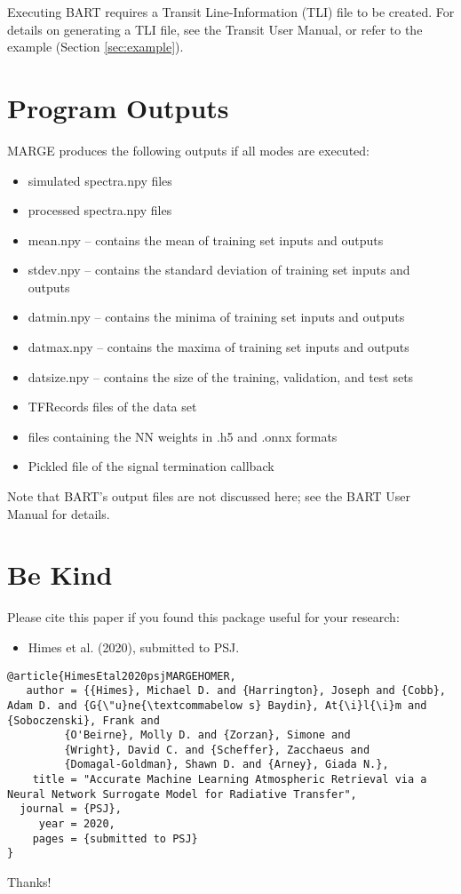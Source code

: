 \documentclass[letterpaper, 12pt]{article}
\begin{document}
\noindent  Executing BART requires a Transit Line-Information (TLI) file to 
be created.  For details on generating a TLI file, see the Transit User Manual, 
or refer to the example (Section \ref{sec:example}).



\section{Program Outputs}
\label{sec:outputs}

MARGE produces the following outputs if all modes are executed:

\begin{itemize}
\item simulated spectra.npy files
\item processed spectra.npy files
\item mean.npy -- contains the mean of training set inputs and outputs
\item stdev.npy -- contains the standard deviation of training set inputs and 
                   outputs
\item datmin.npy -- contains the minima of training set inputs and outputs
\item datmax.npy -- contains the maxima of training set inputs and outputs
\item datsize.npy -- contains the size of the training, validation, and test 
                     sets
\item TFRecords files of the data set
\item files containing the NN weights in .h5 and .onnx formats
\item Pickled file of the signal termination callback
\end{itemize}

\noindent Note that BART's output files are not discussed here; see the BART 
User Manual for details.



\section{Be Kind}
\label{sec:bekind}
Please cite this paper if you found this package useful for your
research:

\begin{itemize}
\item Himes et al. (2020), submitted to PSJ.
\end{itemize}

\begin{verbatim}
@article{HimesEtal2020psjMARGEHOMER,
   author = {{Himes}, Michael D. and {Harrington}, Joseph and {Cobb}, Adam D. and {G{\"u}ne{\textcommabelow s} Baydin}, At{\i}l{\i}m and {Soboczenski}, Frank and
         {O'Beirne}, Molly D. and {Zorzan}, Simone and
         {Wright}, David C. and {Scheffer}, Zacchaeus and
         {Domagal-Goldman}, Shawn D. and {Arney}, Giada N.},
    title = "Accurate Machine Learning Atmospheric Retrieval via a Neural Network Surrogate Model for Radiative Transfer",
  journal = {PSJ},
     year = 2020,
    pages = {submitted to PSJ}
}
\end{verbatim}

\noindent Thanks!


\end{document}
